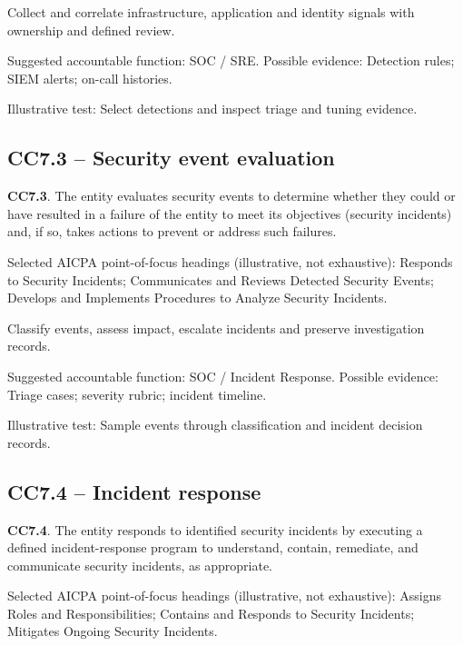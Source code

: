 \documentclass[10pt,oneside]{report}
\begin{document}
\begin{engineeringbox}
Collect and correlate infrastructure, application and identity signals with ownership and defined review.
\end{engineeringbox}
Suggested accountable function: SOC / SRE. Possible evidence: Detection rules; SIEM alerts; on-call histories.

Illustrative test: Select detections and inspect triage and tuning evidence.

\subsection*{CC7.3 -- Security event evaluation}
\begin{aicpabox}
\textbf{CC7.3}. The entity evaluates security events to determine whether they could or have resulted in a failure of the entity to meet its objectives (security incidents) and, if so, takes actions to prevent or address such failures.\par{}
\end{aicpabox}
Selected AICPA point-of-focus headings (illustrative, not exhaustive): Responds to Security Incidents; Communicates and Reviews Detected Security Events; Develops and Implements Procedures to Analyze Security Incidents.

\begin{engineeringbox}
Classify events, assess impact, escalate incidents and preserve investigation records.
\end{engineeringbox}
Suggested accountable function: SOC / Incident Response. Possible evidence: Triage cases; severity rubric; incident timeline.

Illustrative test: Sample events through classification and incident decision records.

\subsection*{CC7.4 -- Incident response}
\begin{aicpabox}
\textbf{CC7.4}. The entity responds to identified security incidents by executing a defined incident-response program to understand, contain, remediate, and communicate security incidents, as appropriate.\par{}
\end{aicpabox}
Selected AICPA point-of-focus headings (illustrative, not exhaustive): Assigns Roles and Responsibilities; Contains and Responds to Security Incidents; Mitigates Ongoing Security Incidents.
\end{document}
